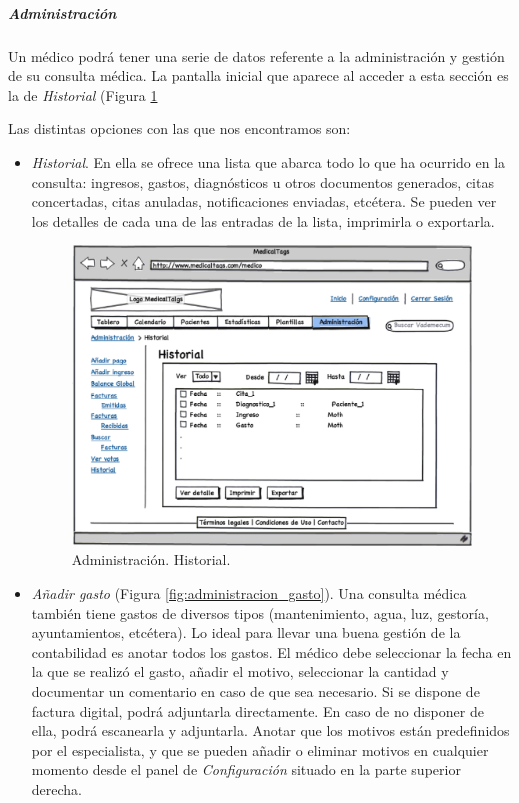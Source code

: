 		
		\subparagraph{Administración} %
		\label{par:medico_administracion}
		
			Un médico podrá tener una serie de datos referente a la administración y gestión de su consulta médica. La pantalla inicial que aparece al acceder a esta sección es la de \textit{Historial} (Figura \ref{fig:administracion_historial}
			
			Las distintas opciones con las que nos encontramos son:
			
			\begin{itemize}
				\item \textit{Historial}. En ella se ofrece una lista que abarca todo lo que ha ocurrido en la consulta: ingresos, gastos, diagnósticos u otros documentos generados, citas concertadas, citas anuladas, notificaciones enviadas, etcétera. Se pueden ver los detalles de cada una de las entradas de la lista, imprimirla o exportarla.
				
				
					\begin{figure}[H]
				  		\centering
				    	\includegraphics[width=12cm]{img/eps/22_1_Administracion_Historial_Medico.eps}
				  		\caption{Administración. Historial.}
				  		\label{fig:administracion_historial}
					\end{figure}
				
				\item \textit{Añadir gasto} (Figura \ref{fig:administracion_gasto}). Una consulta médica también tiene gastos de diversos tipos (mantenimiento, agua, luz, gestoría, ayuntamientos, etcétera). Lo ideal para llevar una buena gestión de la contabilidad es anotar todos los gastos. El médico debe seleccionar la fecha en la que se realizó el gasto, añadir el motivo, seleccionar la cantidad y documentar un comentario en caso de que sea necesario. Si se dispone de factura digital, podrá adjuntarla directamente. En caso de no disponer de ella, podrá escanearla y adjuntarla. Anotar que los motivos están predefinidos por el especialista, y que se pueden añadir o eliminar motivos en cualquier momento desde el panel de \textit{Configuración} situado en la parte superior derecha.
				

\end{itemize}
